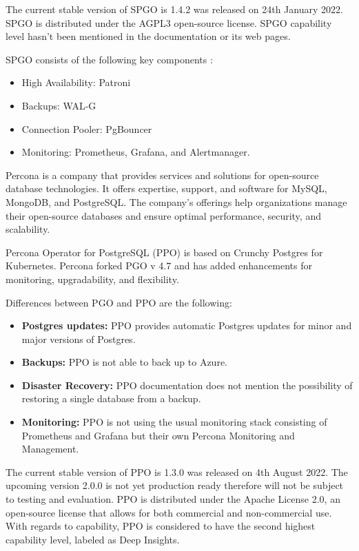 The current stable version of SPGO is 1.4.2 was released on 24th January 2022. \cite{ SPGOgitlabChangelog} SPGO is distributed under the AGPL3 open-source license. \cite{SPGODocuLicence} SPGO capability level hasn’t been mentioned in the documentation or its web pages.

SPGO consists of the following key components \cite{PostgresOnKubernetes}:
\begin{itemize}
  \item High Availability: Patroni
  \item Backups: WAL-G
  \item Connection Pooler: PgBouncer
  \item Monitoring: Prometheus, Grafana, and Alertmanager.
\end{itemize}



\pagebreak
{}
Percona is a company that provides services and solutions for open-source database technologies. It offers expertise, support, and software for MySQL, MongoDB, and PostgreSQL. The company's offerings help organizations manage their open-source databases and ensure optimal performance, security, and scalability. \cite{Percona}

Percona Operator for PostgreSQL (PPO) is based on Crunchy Postgres for Kubernetes. Percona forked PGO v 4.7 and has added enhancements for monitoring, upgradability, and flexibility. \cite{PerconaBlogProsAndCons}

Differences between PGO and PPO are the following:
\begin{itemize}
  \item \textbf{Postgres updates:} PPO provides automatic Postgres updates for minor and major versions of Postgres.  \cite{PerconaDocuUpdate}
  \item \textbf{Backups:} PPO is not able to back up to Azure. \cite{PerconaDocuCompare}
  \item \textbf{Disaster Recovery:} PPO documentation does not mention the possibility of restoring a single database from a backup. \cite{PerconaDocuBackups}
  \item \textbf{Monitoring:} PPO is not using the usual monitoring stack consisting of Prometheus and Grafana but their own Percona Monitoring and Management. \cite{PerconaDocuMonitoring}
\end{itemize}

The current stable version of PPO is 1.3.0 was released on 4th August 2022. The upcoming version 2.0.0 is not yet production ready therefore will not be subject to testing and evaluation. \cite{PerconaDocuV2} PPO is distributed under the Apache License 2.0, an open-source license that allows for both commercial and non-commercial use. With regards to capability, PPO is considered to have the second highest capability level, labeled as Deep Insights. \cite{OperatorHubPercona}

